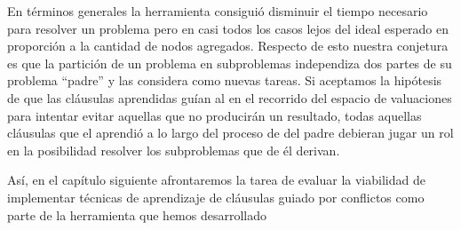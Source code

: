En términos generales la herramienta consiguió disminuir el tiempo necesario
para resolver un problema pero en casi todos los casos lejos del ideal
esperado en proporción a la cantidad de nodos agregados. Respecto de esto
nuestra conjetura es que la partición de un problema en subproblemas
independiza dos partes de su problema ``padre'' y las considera como nuevas
tareas. Si aceptamos la hipótesis de que las cláusulas aprendidas guían al
\ssolver en el recorrido del espacio de valuaciones para intentar evitar
aquellas que no producirán un resultado, todas aquellas cláusulas que el
\ssolver aprendió a lo largo del proceso de \solving del padre debieran jugar
un rol en la posibilidad resolver los subproblemas que de él derivan.

Así, en el capítulo siguiente afrontaremos la tarea de evaluar la viabilidad
de implementar técnicas de aprendizaje de cláusulas guiado por conflictos como
parte de la herramienta que hemos desarrollado
